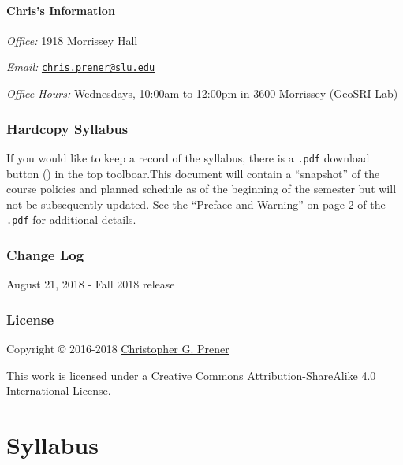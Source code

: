\documentclass[]{book}
\theoremstyle{definition}
\theoremstyle{definition}
\theoremstyle{definition}
\theoremstyle{remark}
\begin{document}
\hypertarget{chriss-information}{%
\subsection*{Chris's Information}\label{chriss-information}}

\emph{Office:} 1918 Morrissey Hall

\emph{Email:}
\href{mailto:chris.prener@slu.edu}{\nolinkurl{chris.prener@slu.edu}}

\emph{Office Hours:} Wednesdays, 10:00am to 12:00pm in 3600 Morrissey
(GeoSRI Lab)

\hypertarget{hardcopy-syllabus}{%
\section*{Hardcopy Syllabus}\label{hardcopy-syllabus}}

If you would like to keep a record of the syllabus, there is a
\texttt{.pdf} download button () in the top toolboar.This document will
contain a ``snapshot'' of the course policies and planned schedule as of
the beginning of the semester but will not be subsequently updated. See
the ``Preface and Warning'' on page 2 of the \texttt{.pdf} for
additional details.

\hypertarget{change-log}{%
\section*{Change Log}\label{change-log}}

August 21, 2018 - Fall 2018 release

\hypertarget{license}{%
\section*{License}\label{license}}

Copyright © 2016-2018 \href{https://chris-prener.github.io}{Christopher
G. Prener}

This work is licensed under a Creative Commons Attribution-ShareAlike
4.0 International License.

\hypertarget{part-syllabus}{%
\part{Syllabus}\label{part-syllabus}}
\end{document}
